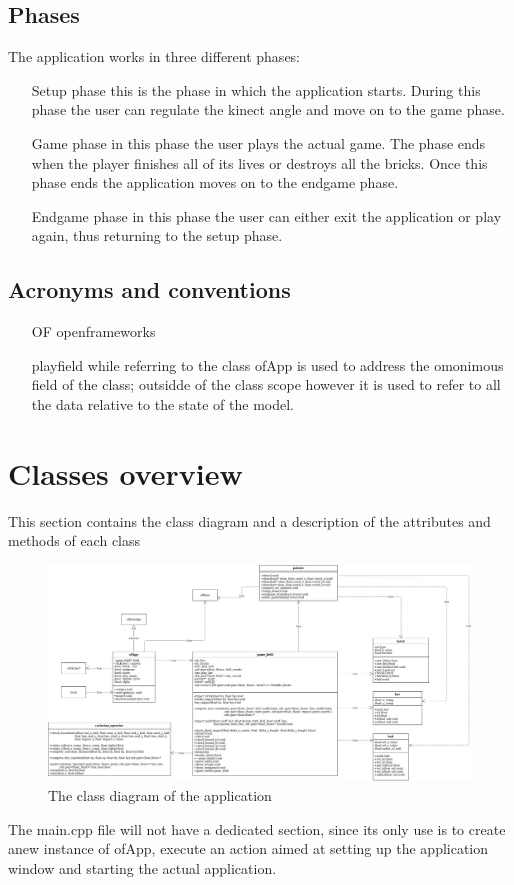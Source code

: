 \documentclass[]{article}
\begin{document}
\subsection{Phases}
The application works in three different phases:
\begin{itemize}
	\item [Setup phase] this is the phase in which the application starts. During this phase the user can regulate the kinect angle and move on to the game phase.
	\item  [Game phase] in this phase the user plays the actual game. The phase ends when the player finishes all of its lives or destroys all the bricks. Once this phase ends the application moves on to the endgame phase.
	\item [Endgame phase] in this phase the user can either exit the application or play again, thus returning to the setup phase. 
\end{itemize}
\subsection{Acronyms and conventions}
\begin{itemize}
	\item [OF] openframeworks
	\item [playfield] while referring to the class ofApp is used to address the omonimous field of the class; outsidde of the class scope however it is used to refer to all the data relative to the state of the model.
\end{itemize}
\newpage
\section{Classes overview}
This section contains the class diagram and a description of the attributes and methods of each class
\begin{figure}[h!]
    \centering
    \includegraphics[angle=90, scale=0.25]{calss_diagram.jpg}
    \caption{The class diagram of the application}
    \label{fig:Class diagram}
\end{figure}
The main.cpp file will not have a dedicated section, since its only use is to create anew instance of ofApp, execute an action aimed at setting up the application window and starting the actual application.\\
\end{document}
